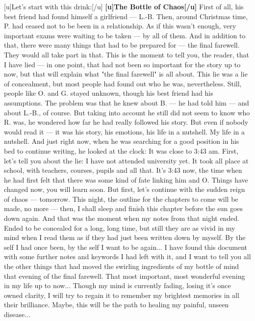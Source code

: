 [u]Let's start with this drink:[/u]
\textbf{[u]The Bottle of Chaos[/u]}
First of all, his best friend had found himself a girlfriend --- L.-B. Then, around Christmas time, P. had ceased not to be been in a relationship. As if this wasn't enough, very important exams were waiting to be taken --- by all of them. And in addition to that, there were many things that had to be prepared for --- the final farewell. They would all take part in that. 
This is the moment to tell you, the reader, that I have lied --- in one point, that had not been so important for the story up to now, but that will explain what "the final farewell" is all about. This lie was a lie of concealment, but most people had found out who he was, nevertheless. Still, people like O. and G. stayed unknown, though his best friend had his assumptions. The problem was that he knew about B. --- he had told him --- and about L.-B., of course. But taking into account he still did not seem to know who R. was, he wondered how far he had really followed his story. But even if nobody would read it --- it was his story, his emotions, his life in a nutshell. My life in a nutshell. And just right now, when he was searching for a good position in his bed to continue writing, he looked at the clock: It was close to 3:43 am. First, let's tell you about the lie: I have not attended university yet. It took all place at school, with teachers, courses, pupils and all that. It's 3:43 now, the time when he had first felt that there was some kind of fate linking him and O. 
Things have changed now, you will learn soon. But first, let's continue with the sudden reign of chaos --- tomorrow. This night, the outline for the chapters to come will be made, no more --- then, I shall sleep and finish this chapter before the sun goes down again. 
And that was the moment when my notes from that night ended. Ended to be concealed for a long, long time, but still they are as vivid in my mind when I read them as if they had just been written down by myself. By the self I had once been, by the self I want to be again... 
I have found this document with some further notes and keywords I had left with it, and I want to tell you all the other things that had moved the swirling ingredients of my bottle of mind that evening of the final farewell. That most important, most wonderful evening in my life up to now... 
Though my mind is currently fading, losing it's once owned clarity, I will try to regain it to remember my brightest memories in all their brilliance. Maybe, this will be the path to healing my painful, unseen disease... 
